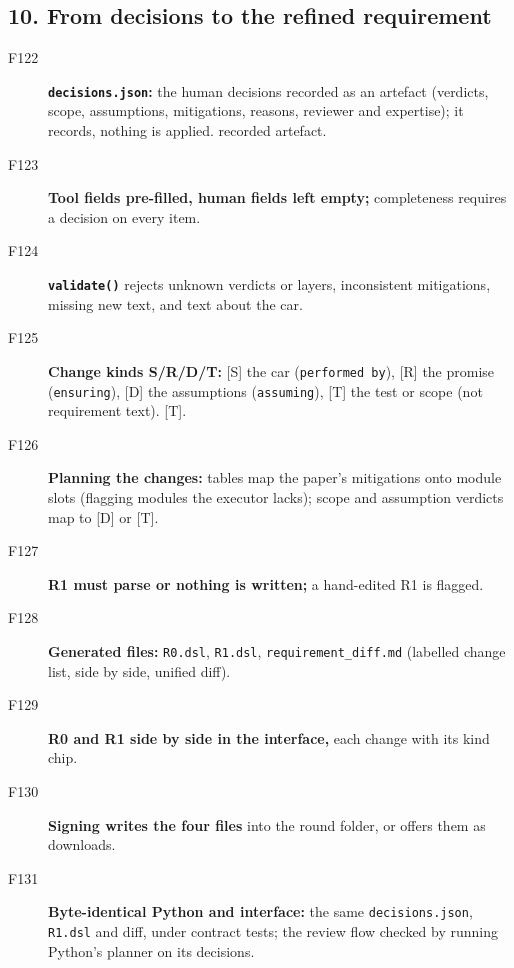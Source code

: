 \subsection*{10. From decisions to the refined requirement}

\begin{description}
\item[F122] \textbf{\texttt{decisions.json}:} the human decisions recorded as an artefact (verdicts, scope, assumptions, mitigations, reasons, reviewer and expertise); it records, nothing is applied.  \tagnew{} recorded artefact.
\item[F123] \textbf{Tool fields pre-filled, human fields left empty;} completeness requires a decision on every item. \tagnew{}
\item[F124] \textbf{\texttt{validate()}} rejects unknown verdicts or layers, inconsistent mitigations, missing new text, and text about the car. \tagnew{}
\item[F125] \textbf{Change kinds S/R/D/T:} [S] the car (\texttt{performed by}), [R] the promise (\texttt{ensuring}), [D] the assumptions (\texttt{assuming}), [T] the test or scope (not requirement text).  \tagnew{} [T].
\item[F126] \textbf{Planning the changes:} tables map the paper's mitigations onto module slots (flagging modules the executor lacks); scope and assumption verdicts map to [D] or [T]. \tagnew{} 
\item[F127] \textbf{R1 must parse or nothing is written;} a hand-edited R1 is flagged. \tagnew{}
\item[F128] \textbf{Generated files:} \texttt{R0.dsl}, \texttt{R1.dsl}, \texttt{requirement\_diff.md} (labelled change list, side by side, unified diff). \tagnew{}
\item[F129] \textbf{R0 and R1 side by side in the interface,} each change with its kind chip. 
\item[F130] \textbf{Signing writes the four files} into the round folder, or offers them as downloads. 
\item[F131] \textbf{Byte-identical Python and interface:} the same \texttt{decisions.json}, \texttt{R1.dsl} and diff, under contract tests; the review flow checked by running Python's planner on its decisions. \taginfra
\end{description}

